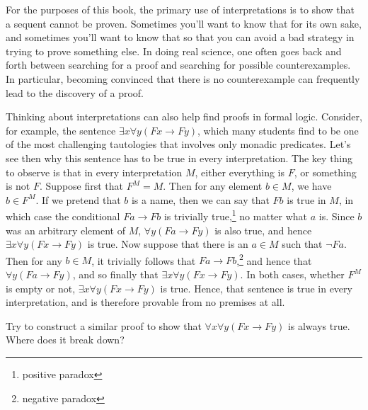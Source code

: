 For the purposes of this book, the primary use of interpretations is
to show that a sequent cannot be proven.  Sometimes you'll want to
know that for its own sake, and sometimes you'll want to know that so
that you can avoid a bad strategy in trying to prove something else.
In doing real science, one often goes back and forth between searching
for a proof and searching for possible counterexamples.  In
particular, becoming convinced that there is no counterexample can
frequently lead to the discovery of a proof.

Thinking about interpretations can also help find proofs in formal
logic.  Consider, for example, the sentence
$\exists x\forall y(Fx\to Fy)$, which many students find to be one of
the most challenging tautologies that involves only monadic
predicates.  Let's see then why this sentence has to be true in every
interpretation.  The key thing to observe is that in every
interpretation $M$, either everything is $F$, or something is not $F$.
Suppose first that $F^M=M$.  Then for any element $b\in M$, we have
$b\in F^M$.  If we pretend that $b$ is a name, then we can say that
$Fb$ is true in $M$, in which case the conditional $Fa\to Fb$ is
trivially true,\footnote{positive paradox} no matter what $a$ is.
Since $b$ was an arbitrary element of $M$, $\forall y(Fa\to Fy)$ is
also true, and hence $\exists x\forall y(Fx\to Fy)$ is true.  Now
suppose that there is an $a\in M$ such that $\neg Fa$.  Then for any
$b\in M$, it trivially follows that $Fa\to Fb$,\footnote{negative
  paradox} and hence that $\forall y(Fa\to Fy)$, and so finally that
$\exists x\forall y(Fx\to Fy)$.  In both cases, whether $F^M$ is empty
or not, $\exists x\forall y(Fx\to Fy)$ is true.  Hence, that sentence
is true in every interpretation, and is therefore provable from no
premises at all.

\begin{exercise} Try to construct a similar proof to show that
  $\forall x\forall y(Fx\to Fy)$ is always true.  Where does it break
  down? \end{exercise}


